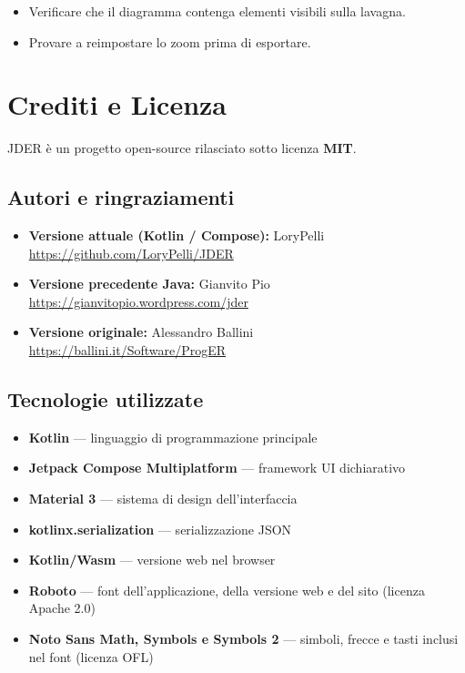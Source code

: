 \documentclass[a4paper,11pt]{article}
\newcommand\mediumweight{\fontseries{mb}\selectfont}
\newcommand\currenticon{book}
\newcommand\tocicon{book}
\newcommand\sectionicon[1]{%
  \renewcommand\currenticon{#1}%
  \addtocontents{toc}{\gdef\protect\tocicon{#1}}}
\newcommand\jder{{\mediumweight JDER}}
\begin{document}
\begin{tcolorbox}[warnbox, title={L'esportazione PNG è vuota o incompleta}]
  \begin{itemize}
    \item Verificare che il diagramma contenga elementi visibili sulla lavagna.
    \item Provare a reimpostare lo zoom prima di esportare.
  \end{itemize}
\end{tcolorbox}

\sectionicon{code}
\section{Crediti e Licenza}
\label{sec:crediti}

\jder{} è un progetto open-source rilasciato sotto licenza \textbf{MIT}.

\subsection*{Autori e ringraziamenti}
\begin{itemize}
  \item \textbf{Versione attuale (Kotlin / Compose):} LoryPelli\\
        \url{https://github.com/LoryPelli/JDER}
  \item \textbf{Versione precedente Java:} Gianvito Pio\\
        \url{https://gianvitopio.wordpress.com/jder}
  \item \textbf{Versione originale:} Alessandro Ballini\\
        \url{https://ballini.it/Software/ProgER}
\end{itemize}

\subsection*{Tecnologie utilizzate}
\begin{itemize}
  \item \textbf{Kotlin} --- linguaggio di programmazione principale
  \item \textbf{Jetpack Compose Multiplatform} --- framework UI dichiarativo
  \item \textbf{Material 3} --- sistema di design dell'interfaccia
  \item \textbf{kotlinx.serialization} --- serializzazione JSON
  \item \textbf{Kotlin/Wasm} --- versione web nel browser
  \item \textbf{Roboto} --- font dell'applicazione, della versione web e del sito (licenza Apache 2.0)
  \item \textbf{Noto Sans Math, Symbols e Symbols 2} --- simboli, frecce e tasti inclusi nel font (licenza OFL)
\end{itemize}
\end{document}
